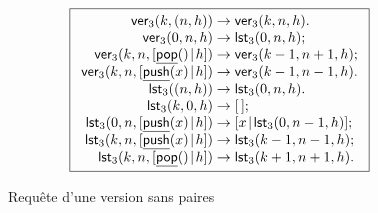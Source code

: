 \begin{figure}
\begin{equation*}
\boxed{%
\begin{array}{r@{\;}l@{\;}l}
\fun{ver}_3(k,\pair{n}{h}) & \rightarrow & \fun{ver}_3(k,n,h).\\
\fun{ver}_3(0,n,h) & \rightarrow & \fun{lst}_3(0,n,h);\\
\fun{ver}_3(k,n,\cons{\ufun{pop}()}{h})
                      & \rightarrow & \fun{ver}_3(k-1,n+1,h);\\
\fun{ver}_3(k,n,\cons{\ufun{push}(x)}{h})
                      & \rightarrow & \fun{ver}_3(k-1,n-1,h).\\
\fun{lst}_3(\pair{n}{h}) & \rightarrow & \fun{lst}_3(0,n,h).\\
\fun{lst}_3(k,0,h) & \rightarrow & \el;\\
\fun{lst}_3(0,n,\cons{\ufun{push}(x)}{h}) & \rightarrow
                      & \cons{x}{\fun{lst}_3(0,n-1,h)};\\
\fun{lst}_3(k,n,\cons{\ufun{push}(x)}{h}) & \rightarrow
                      & \fun{lst}_3(k-1,n-1,h);\\
\fun{lst}_3(k,n,\cons{\ufun{pop}()}{h}) & \rightarrow
                      & \fun{lst}_3(k+1,n+1,h).
\end{array}}
\end{equation*}
\caption{Requête d'une version sans paires}
\label{fig:ver_no_pair}
\end{figure}

